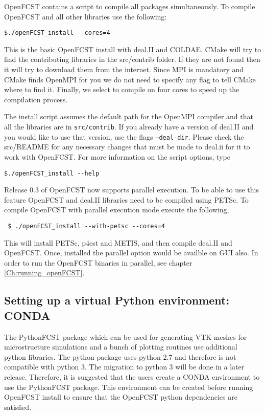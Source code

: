 OpenFCST contains a script to compile all packages simultaneously. To compile OpenFCST and all other libraries use the following:
\begin{lstlisting}
$./openFCST_install --cores=4
\end{lstlisting}

This is the basic OpenFCST install with deal.II and COLDAE. CMake will try to find the contributing libraries in the src/contrib folder. If they are not found then it will try to download them from the internet. Since MPI is mandatory and CMake finds OpenMPI for you we do not need to specify any flag to tell CMake where to find it.
Finally, we select to compile on four cores to speed up the compilation process. 

The install script assumes the default path for the OpenMPI compiler and that all the libraries are in \texttt{src/contrib}. If you already have a version of deal.II and you would like to use that version, use the flags \texttt{--deal-dir}. Please check the src/README for any necessary changes that must be made to deal.ii for it to work with OpenFCST. For more information on the script options, type
\begin{lstlisting}
$./openFCST_install --help
\end{lstlisting}

Release 0.3 of OpenFCST now supports parallel execution. To be able to use this feature OpenFCST and deal.II libraries need to be compiled using PETSc. To compile OpenFCST with parallel execution mode execute the following,
\begin{lstlisting}
 $ ./openFCST_install --with-petsc --cores=4
\end{lstlisting}

This will install PETSc, p4est and METIS, and then compile deal.II and OpenFCST. Once, installed the parallel option would be availble on GUI also. In order to run the OpenFCST binaries in parallel, see chapter \ref{Ch:running_openFCST}.

\subsection{Setting up a virtual Python environment: CONDA}

The PythonFCST package which can be used for generating VTK meshes for microstructure simulations and a bunch of plotting routines use additional python libraries. The python package uses python 2.7 and therefore is not compatible with python 3. The migration to python 3 will be done in a later release. Therefore, it is suggested that the users create a CONDA environment to use the PythonFCST package. This environment can be created before running OpenFCST install to ensure that the OpenFCST python dependencies are satisfied.

